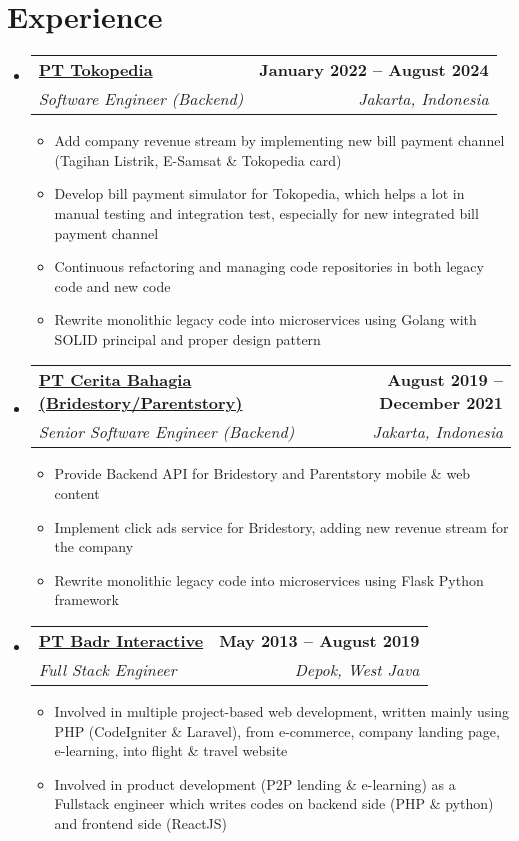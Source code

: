\documentclass[letterpaper,11pt]{article}
\makeatletter
\newcommand{\resumeItem}[1]{
  \item\small{
      {#1 \vspace{-2pt}}
  }
}
\newcommand{\resumeSubheading}[4]{
  \vspace{-2pt}\item
  \begin{tabular*}{1.0\textwidth}[t]{l@{\extracolsep{\fill}}r}
    \textbf{#1} & \textbf{\small #2} \\
    \textit{\small#3} & \textit{\small #4} \\
  \end{tabular*}\vspace{-7pt}
}
\newcommand{\resumeSubHeadingListStart}{\begin{itemize}[leftmargin=0.0in, label={}]}
\newcommand{\resumeSubHeadingListEnd}{\end{itemize}}
\newcommand{\resumeItemListStart}{\begin{itemize}}
\newcommand{\resumeItemListEnd}{\end{itemize}\vspace{-5pt}}
\makeatother
\begin{document}
\section{Experience}
\resumeSubHeadingListStart

\resumeSubheading
{\href{https://www.tokopedia.com/}{PT Tokopedia}}{January 2022 -- August 2024}
{Software Engineer (Backend)}{Jakarta, Indonesia}
\resumeItemListStart
\resumeItem{Add company revenue stream by implementing new bill payment channel (Tagihan Listrik, E-Samsat \& Tokopedia card)}
\resumeItem{Develop bill payment simulator for Tokopedia, which helps a lot in manual testing and integration test, especially for new integrated bill payment channel}
\resumeItem{Continuous refactoring and managing code repositories in both legacy code and new code}
\resumeItem{Rewrite monolithic legacy code into microservices using Golang with SOLID principal and proper design pattern}
\resumeItemListEnd

\resumeSubheading
{\href{https://www.bridestory.com/}{PT Cerita Bahagia (Bridestory/Parentstory)}}{August 2019 -- December 2021}
{Senior Software Engineer (Backend)}{Jakarta, Indonesia}
\resumeItemListStart
\resumeItem{Provide Backend API for Bridestory and Parentstory mobile \& web content}
\resumeItem{Implement click ads service for Bridestory, adding new revenue stream for the company}
\resumeItem{Rewrite monolithic legacy code into microservices using Flask Python framework}
\resumeItemListEnd

\resumeSubheading
{\href{https://badr.co.id/}{PT Badr Interactive}}{May 2013 -- August 2019}
{Full Stack Engineer}{Depok, West Java}
\resumeItemListStart
\resumeItem{Involved in multiple project-based web development, written mainly using PHP (CodeIgniter \& Laravel), from e-commerce, company landing page, e-learning, into flight \& travel website}
\resumeItem{Involved in product development (P2P lending \& e-learning) as a Fullstack engineer which writes codes on backend side (PHP \& python) and frontend side (ReactJS)}
\resumeItemListEnd

\resumeSubHeadingListEnd
\vspace{-16pt}
\end{document}
